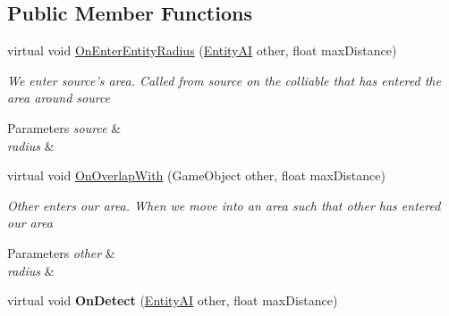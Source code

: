 \subsection*{Public Member Functions}
\begin{DoxyCompactItemize}
\item 
\hypertarget{class_skyrates_1_1_entity_1_1_entity_a_i_a8fd2d35300cf694c74cb273ab4f20fb9}{virtual void \hyperlink{class_skyrates_1_1_entity_1_1_entity_a_i_a8fd2d35300cf694c74cb273ab4f20fb9}{On\-Enter\-Entity\-Radius} (\hyperlink{class_skyrates_1_1_entity_1_1_entity_a_i}{Entity\-A\-I} other, float max\-Distance)}\label{class_skyrates_1_1_entity_1_1_entity_a_i_a8fd2d35300cf694c74cb273ab4f20fb9}

\begin{DoxyCompactList}\small\item\em We enter source's area. Called from source on the colliable that has entered the area around source 


\begin{DoxyParams}{Parameters}
{\em source} & \\
\hline
{\em radius} & \\
\hline
\end{DoxyParams}
 \end{DoxyCompactList}\item 
\hypertarget{class_skyrates_1_1_entity_1_1_entity_a_i_a8a8784a8459775157d9d23fa95866af1}{virtual void \hyperlink{class_skyrates_1_1_entity_1_1_entity_a_i_a8a8784a8459775157d9d23fa95866af1}{On\-Overlap\-With} (Game\-Object other, float max\-Distance)}\label{class_skyrates_1_1_entity_1_1_entity_a_i_a8a8784a8459775157d9d23fa95866af1}

\begin{DoxyCompactList}\small\item\em Other enters our area. When we move into an area such that other has entered our area 


\begin{DoxyParams}{Parameters}
{\em other} & \\
\hline
{\em radius} & \\
\hline
\end{DoxyParams}
 \end{DoxyCompactList}\item 
\hypertarget{class_skyrates_1_1_entity_1_1_entity_a_i_af302b60c83be7a2e6721c71ca418edab}{virtual void {\bfseries On\-Detect} (\hyperlink{class_skyrates_1_1_entity_1_1_entity_a_i}{Entity\-A\-I} other, float max\-Distance)}\label{class_skyrates_1_1_entity_1_1_entity_a_i_af302b60c83be7a2e6721c71ca418edab}

\end{DoxyCompactItemize}
